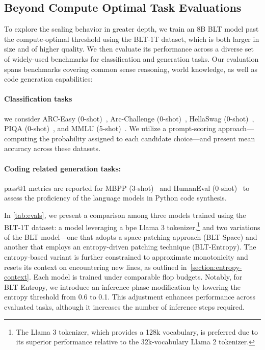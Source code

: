 \subsection{Beyond Compute Optimal Task Evaluations}
\label{section:evals}
To explore the scaling behavior in greater depth, we train an 8B {\textsc BLT} model past the compute-optimal threshold using the {\textsc BLT}-1T dataset, which is both larger in size and of higher quality. We then evaluate its performance across a diverse set of widely-used benchmarks for classification and generation tasks. Our evaluation spans benchmarks covering common sense reasoning, world knowledge, as well as code generation capabilities:
\paragraph{Classification tasks} we consider ARC-Easy (0-shot)~\citep{Eval_ARC}, Arc-Challenge (0-shot)~\citep{Eval_ARC}, HellaSwag (0-shot)~\citep{Eval_hellaswag}, PIQA (0-shot)~\citep{Eval_piqa}, and MMLU (5-shot)~\citep{hendrycks2020measuring}. We utilize a prompt-scoring approach—computing the probability assigned to each candidate choice—and present mean accuracy across these datasets.
\paragraph{Coding related generation tasks:} pass@1 metrics are reported for MBPP (3-shot)~\citep{Eval_MBPP} and HumanEval (0-shot)~\citep{Eval_HumanEval} to assess the proficiency of the language models in Python code synthesis.

In \autoref{tab:evals}, we present a comparison among three models trained using the {\textsc BLT}-1T dataset: a model leveraging a bpe Llama 3 tokenizer,\footnote{The Llama 3 tokenizer, which provides a 128k vocabulary, is preferred due to its superior performance relative to the 32k-vocabulary Llama 2 tokenizer.} and two variations of the {\textsc BLT} model—one that adopts a space-patching approach ({\textsc BLT}-Space) and another that employs an entropy-driven patching technique ({\textsc BLT}-Entropy). The entropy-based variant is further constrained to approximate monotonicity and resets its context on encountering new lines, as outlined in~\autoref{section:entropy-context}. Each model is trained under comparable flop budgets. Notably, for {\textsc BLT}-Entropy, we introduce an inference phase modification by lowering the entropy threshold from 0.6 to 0.1. This adjustment enhances performance across evaluated tasks, although it increases the number of inference steps required.

